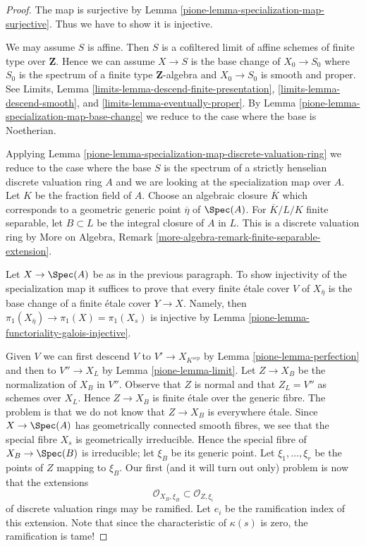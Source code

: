 \begin{proof}

The map is surjective by
Lemma \ref{pione-lemma-specialization-map-surjective}.
Thus we have to show it is injective.

\medskip\noindent
We may assume $S$ is affine. Then $S$ is a cofiltered limit of affine
schemes of finite type over $\mathbf{Z}$.
Hence we can assume $X \to S$ is the
base change of $X_0 \to S_0$ where $S_0$ is the spectrum of a finite
type $\mathbf{Z}$-algebra and $X_0 \to S_0$ is smooth and proper.
See Limits, Lemma \ref{limits-lemma-descend-finite-presentation},
\ref{limits-lemma-descend-smooth}, and
\ref{limits-lemma-eventually-proper}. By
Lemma \ref{pione-lemma-specialization-map-base-change}
we reduce to the case where the base is Noetherian.

\medskip\noindent
Applying Lemma \ref{pione-lemma-specialization-map-discrete-valuation-ring}
we reduce to the case where the base $S$ is the spectrum of a
strictly henselian discrete valuation ring $A$ and we are
looking at the specialization map over $A$.
Let $K$ be the fraction field of $A$.
Choose an algebraic closure $\overline{K}$ which
corresponds to a geometric generic point $\overline{\eta}$ of $\Spec(A)$.
For $\overline{K}/L/K$ finite separable, let $B \subset L$ be the
integral closure of $A$ in $L$. This is a discrete
valuation ring by
More on Algebra, Remark \ref{more-algebra-remark-finite-separable-extension}.

\medskip\noindent
Let $X \to \Spec(A)$ be as in the previous paragraph.
To show injectivity of the specialization map
it suffices to prove that every finite
\'etale cover $V$ of $X_{\overline{\eta}}$ is the base
change of a finite \'etale cover $Y \to X$.
Namely, then $\pi_1(X_{\overline{\eta}}) \to \pi_1(X) = \pi_1(X_s)$
is injective by Lemma \ref{pione-lemma-functoriality-galois-injective}.

\medskip\noindent
Given $V$ we can first descend $V$ to $V' \to X_{K^{sep}}$ by
Lemma \ref{pione-lemma-perfection} and then to
$V'' \to X_L$ by Lemma \ref{pione-lemma-limit}.
Let $Z \to X_B$ be the normalization of $X_B$ in $V''$.
Observe that $Z$ is normal and that $Z_L = V''$ as schemes
over $X_L$. Hence $Z \to X_B$ is finite \'etale over
the generic fibre. The problem is that we do not know that
$Z \to X_B$ is everywhere \'etale. Since $X \to \Spec(A)$
has geometrically connected smooth fibres, we see that
the special fibre $X_s$ is geometrically irreducible.
Hence the special fibre of $X_B \to \Spec(B)$ is irreducible;
let $\xi_B$ be its generic point. Let
$\xi_1, \ldots, \xi_r$ be the points of $Z$ mapping to
$\xi_B$. Our first (and it will turn out only) problem
is now that the extensions
$$
\mathcal{O}_{X_B, \xi_B} \subset \mathcal{O}_{Z, \xi_i}
$$
of discrete valuation rings may be ramified. Let $e_i$ be
the ramification index of this extension. Note that since the
characteristic of $\kappa(s)$ is zero, the ramification is tame!


\end{proof}
